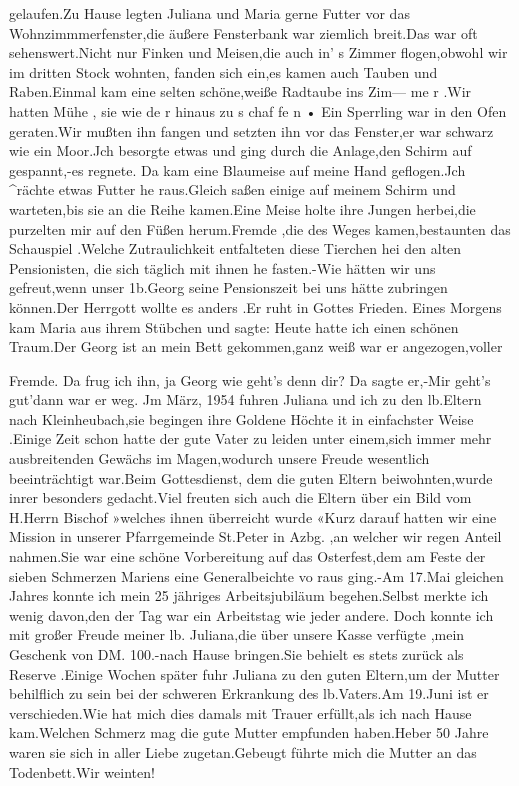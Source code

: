 \documentclass[a4paper,11pt]{article}
\begin{document}
gelaufen.Zu Hause legten Juliana und Maria gerne Futter vor das Wohnzimmmerfenster,die äußere Fensterbank war ziemlich breit.Das war oft sehenswert.Nicht nur Finken und Meisen,die auch in' s Zimmer flogen,obwohl wir im dritten Stock wohnten, fanden sich ein,es kamen auch Tauben und Raben.Einmal kam eine selten schöne,weiße Radtaube ins Zim— me r .Wir hatten Mühe , sie wie de r hinaus zu s chaf fe n • Ein Sperrling war in den Ofen geraten.Wir mußten ihn fangen und setzten ihn vor das Fenster,er war schwarz wie ein Moor.Jch besorgte etwas und ging durch die Anlage,den Schirm auf gespannt,-es regnete. Da kam eine Blaumeise auf meine Hand geflogen.Jch ^rächte etwas Futter he raus.Gleich saßen einige auf meinem Schirm und warteten,bis sie an die Reihe kamen.Eine Meise holte ihre Jungen herbei,die purzelten mir auf den Füßen herum.Fremde ,die des Weges kamen,bestaunten das Schauspiel .Welche Zutraulichkeit entfalteten diese Tierchen hei den alten Pensionisten, die sich täglich mit ihnen he fasten.-Wie hätten wir uns gefreut,wenn unser 1b.Georg seine Pensionszeit bei uns hätte zubringen können.Der Herrgott wollte es anders .Er ruht in Gottes Frieden. Eines Morgens kam Maria aus ihrem Stübchen und sagte: Heute hatte ich einen schönen Traum.Der Georg ist an mein Bett gekommen,ganz weiß war er angezogen,voller

Fremde. Da frug ich ihn, ja Georg wie geht’s denn dir? Da sagte er,-Mir geht’s gut’dann war er weg. Jm März, 1954 fuhren Juliana und ich zu den lb.Eltern nach Kleinheubach,sie begingen ihre Goldene Höchte it in einfachster Weise .Einige Zeit schon hatte der gute Vater zu leiden unter einem,sich immer mehr ausbreitenden Gewächs im Magen,wodurch unsere Freude wesentlich beeinträchtigt war.Beim Gottesdienst, dem die guten Eltern beiwohnten,wurde inrer besonders gedacht.Viel freuten sich auch die Eltern über ein Bild vom H.Herrn Bischof »welches ihnen überreicht wurde «Kurz darauf hatten wir eine Mission in unserer Pfarrgemeinde St.Peter in Azbg. ,an welcher wir regen Anteil nahmen.Sie war eine schöne Vorbereitung auf das Osterfest,dem am Feste der sieben Schmerzen Mariens eine Generalbeichte vo raus ging.-Am 17.Mai gleichen Jahres konnte ich mein 25 jähriges Arbeitsjubiläum begehen.Selbst merkte ich wenig davon,den der Tag war ein Arbeitstag wie jeder andere. Doch konnte ich mit großer Freude meiner lb. Juliana,die über unsere Kasse verfügte ,mein Geschenk von DM. 100.-nach Hause bringen.Sie behielt es stets zurück als Reserve .Einige Wochen später fuhr Juliana zu den guten Eltern,um der Mutter behilflich zu sein bei der schweren Erkrankung des lb.Vaters.Am 19.Juni ist er verschieden.Wie hat mich dies damals mit Trauer erfüllt,als ich nach Hause kam.Welchen Schmerz mag die gute Mutter empfunden haben.Heber 50 Jahre waren sie sich in aller Liebe zugetan.Gebeugt führte mich die Mutter an das Todenbett.Wir weinten!
\end{document}
